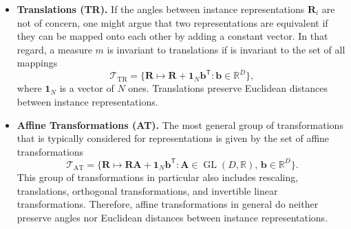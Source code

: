 \documentclass{article}
\newcommand{\Real}{\mathbb{R}}
\newcommand{\R}{\bm{R}}
\newcommand{\transp}{\mathsf{T}}
\begin{document}
\begin{itemize}
    \item \textbf{Translations (TR).} If the angles between instance representations $\R_i$ are not of concern, one might argue that two representations are equivalent if they can be mapped onto each other by adding a constant vector.
    In that regard, a measure $m$ is invariant to translations if is invariant to the set of all mappings
    \begin{equation}
     \mathcal{T}_\text{TR} = \{\R\mapsto \R + \bm{1}_N\bm{b}^{\transp}: \bm{b}\in\Real^D\},
    \end{equation}
    where $\bm{1}_N$ is a vector of $N$ ones. %
    Translations preserve Euclidean distances between instance representations.

    \item \textbf{Affine Transformations (AT).}
    The most general group of transformations that is typically considered for representations is given by the set of affine transformations
    \begin{equation}
     \mathcal{T}_\text{AT} = \{\R\mapsto \R\bm{A} + \bm{1}_N\bm{b}^\transp: \bm{A}\in\operatorname{GL}(D,\Real),\, \bm{b}\in\Real^D\}.
    \end{equation}
    This group of transformations in particular also includes rescaling, translations, orthogonal transformations, and invertible linear transformations.
    Therefore, affine transformations in general do neither preserve angles nor Euclidean distances between instance representations.
\end{itemize}
\end{document}
